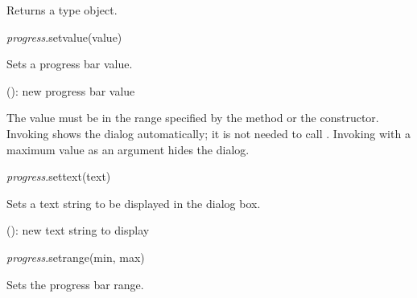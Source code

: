 \documentclass[a4paper,12pt,twoside,extrafontsizes]{memoir}
\begin{document}
\begin{funcret}
	Returns a  type object.
\end{funcret}


\begin{luafuncprototype}
\emph{progress}.setvalue(value)
\end{luafuncprototype}

\begin{funcdescr}
	Sets a progress bar value.
\end{funcdescr}

\begin{funcparams}
	 (): new progress bar value
\end{funcparams}

\begin{funcremarks}
	The value must be in the range specified by the 
	 method or the constructor. Invoking  shows the dialog automatically; it is not needed to call . Invoking  with a maximum value as an argument hides the dialog.
\end{funcremarks}


\begin{luafuncprototype}
\emph{progress}.settext(text)
\end{luafuncprototype}

\begin{funcdescr}
	Sets a text string to be displayed in the dialog box.
\end{funcdescr}

\begin{funcparams}
	 (): new text string to display
\end{funcparams}


\begin{luafuncprototype}
\emph{progress}.setrange(min, max)
\end{luafuncprototype}

\begin{funcdescr}
	Sets the progress bar range.
\end{funcdescr}
\end{document}
